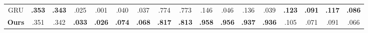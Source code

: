 \begin{table}[t]
{\begin{tabular}{@{} p{0.9cm} p{0.55cm} p{0.55cm} p{0.55cm} p{0.55cm} p{0.55cm} p{0.55cm} p{0.55cm} p{0.55cm} p{0.55cm} p{0.55cm} p{0.55cm} p{0.55cm} p{0.55cm} p{0.52cm} p{0.52cm} p{0.52cm} p{0.52cm} @{}}
\multicolumn{2}{c}{GRU}      
  & \multicolumn{1}{c}{{\textbf{.353}}} %
  & \multicolumn{1}{c}{{\textbf{.343}}} %
  & \multicolumn{1}{c}{.025}         %
  & \multicolumn{1}{c}{.001}         %
  & \multicolumn{1}{c}{.040}         %
  & \multicolumn{1}{c}{.037}         %
  & \multicolumn{1}{c}{.774}         %
  & \multicolumn{1}{c}{.773}         %
  & \multicolumn{1}{c}{.146}         %
  & \multicolumn{1}{c}{.046}         %
  & \multicolumn{1}{c}{.136}         %
  & \multicolumn{1}{c}{.039}         %
  & \multicolumn{1}{c}{{\textbf{.123}}} %
  & \multicolumn{1}{c}{{\textbf{.091}}} %
  & \multicolumn{1}{c}{{\textbf{.117}}} %
  & \multicolumn{1}{c}{{\textbf{.086}}} %
  \\
\multicolumn{2}{c}{\textbf{Ours}} 
  & \multicolumn{1}{c}{.351}         
  & \multicolumn{1}{c}{.342}         
  & \multicolumn{1}{c}{{\textbf{.033}}} %
  & \multicolumn{1}{c}{{\textbf{.026}}} %
  & \multicolumn{1}{c}{{\textbf{.074}}} %
  & \multicolumn{1}{c}{{\textbf{.068}}} %
  & \multicolumn{1}{c}{{\textbf{.817}}} %
  & \multicolumn{1}{c}{{\textbf{.813}}} %
  & \multicolumn{1}{c}{{\textbf{.958}}} %
  & \multicolumn{1}{c}{{\textbf{.956}}} %
  & \multicolumn{1}{c}{{\textbf{.937}}} %
  & \multicolumn{1}{c}{{\textbf{.936}}} %
  & \multicolumn{1}{c}{.105}         
  & \multicolumn{1}{c}{.071}         
  & \multicolumn{1}{c}{.091}         
  & \multicolumn{1}{c}{.066}         
  \\ 
\bottomrule
\end{tabular}}
\end{table}
